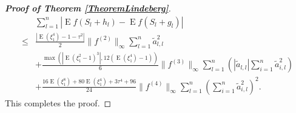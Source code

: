 \documentclass[smallextended]{svjour3}       %
\DeclareMathOperator{\myE}{E}
\begin{document}
\begin{proof}[\textbf{Proof of Theorem \ref{TheoremLindeberg}}]
    \begin{equation*}
        \begin{split}
             &
             \sum_{l=1}^n \left| \myE f(S_{l}+h_{l})-\myE f(S_{l}+g_{l})\right|
             \\
\leq&
\frac{
\left|
\myE (\xi_1^4)-1
            -
            \tau^2
\right|
}{2}
\|f^{(2)}\|_\infty
\sum_{l=1}^n \tilde a_{l,l}^2
\\
            &+
            \frac{
            \max\left(
    \left|\myE (\xi_1^2-1)^3\right|
            ,
12 (\myE (\xi_1^4)-1)
        \right)
            }{6} \|f^{(3)}\|_\infty
            \sum_{l=1}^n 
            \left(|\tilde a_{l,l}|
         \sum_{i=1}^{n} \tilde a_{i,l}^2 
     \right)
         \\
            &+
            \frac{
             16 \myE (\xi_1^8) + 80 \myE (\xi_1^4) + 3\tau^4 + 96 
            }{24} \|f^{(4)} \|_{\infty} 
            \sum_{l=1}^n \left( \sum_{i=1}^n \tilde a_{i,l}^2 \right)^2
            .
        \end{split}
    \end{equation*}
    This completes the proof.
 
\end{proof}
\end{document}
